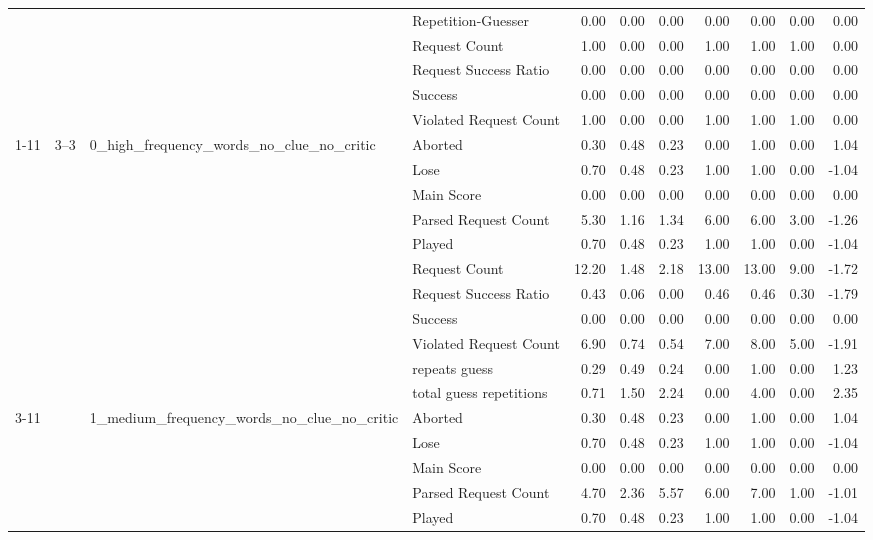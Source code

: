 \begin{tabular}{llllrrrrrrr}
 &  &  & Repetition-Guesser & 0.00 & 0.00 & 0.00 & 0.00 & 0.00 & 0.00 & 0.00 \\
 &  &  & Request Count & 1.00 & 0.00 & 0.00 & 1.00 & 1.00 & 1.00 & 0.00 \\
 &  &  & Request Success Ratio & 0.00 & 0.00 & 0.00 & 0.00 & 0.00 & 0.00 & 0.00 \\
 &  &  & Success & 0.00 & 0.00 & 0.00 & 0.00 & 0.00 & 0.00 & 0.00 \\
 &  &  & Violated Request Count & 1.00 & 0.00 & 0.00 & 1.00 & 1.00 & 1.00 & 0.00 \\
\cline{1-11} \cline{2-11} \cline{3-11}
\multirow[t]{297}{*}{wordle} & \multirow[t]{33}{*}{3--3} & \multirow[t]{11}{*}{0_high_frequency_words_no_clue_no_critic} & Aborted & 0.30 & 0.48 & 0.23 & 0.00 & 1.00 & 0.00 & 1.04 \\
 &  &  & Lose & 0.70 & 0.48 & 0.23 & 1.00 & 1.00 & 0.00 & -1.04 \\
 &  &  & Main Score & 0.00 & 0.00 & 0.00 & 0.00 & 0.00 & 0.00 & 0.00 \\
 &  &  & Parsed Request Count & 5.30 & 1.16 & 1.34 & 6.00 & 6.00 & 3.00 & -1.26 \\
 &  &  & Played & 0.70 & 0.48 & 0.23 & 1.00 & 1.00 & 0.00 & -1.04 \\
 &  &  & Request Count & 12.20 & 1.48 & 2.18 & 13.00 & 13.00 & 9.00 & -1.72 \\
 &  &  & Request Success Ratio & 0.43 & 0.06 & 0.00 & 0.46 & 0.46 & 0.30 & -1.79 \\
 &  &  & Success & 0.00 & 0.00 & 0.00 & 0.00 & 0.00 & 0.00 & 0.00 \\
 &  &  & Violated Request Count & 6.90 & 0.74 & 0.54 & 7.00 & 8.00 & 5.00 & -1.91 \\
 &  &  & repeats guess & 0.29 & 0.49 & 0.24 & 0.00 & 1.00 & 0.00 & 1.23 \\
 &  &  & total guess repetitions & 0.71 & 1.50 & 2.24 & 0.00 & 4.00 & 0.00 & 2.35 \\
\cline{3-11}
 &  & \multirow[t]{11}{*}{1_medium_frequency_words_no_clue_no_critic} & Aborted & 0.30 & 0.48 & 0.23 & 0.00 & 1.00 & 0.00 & 1.04 \\
 &  &  & Lose & 0.70 & 0.48 & 0.23 & 1.00 & 1.00 & 0.00 & -1.04 \\
 &  &  & Main Score & 0.00 & 0.00 & 0.00 & 0.00 & 0.00 & 0.00 & 0.00 \\
 &  &  & Parsed Request Count & 4.70 & 2.36 & 5.57 & 6.00 & 7.00 & 1.00 & -1.01 \\
 &  &  & Played & 0.70 & 0.48 & 0.23 & 1.00 & 1.00 & 0.00 & -1.04 \\

\end{tabular}
